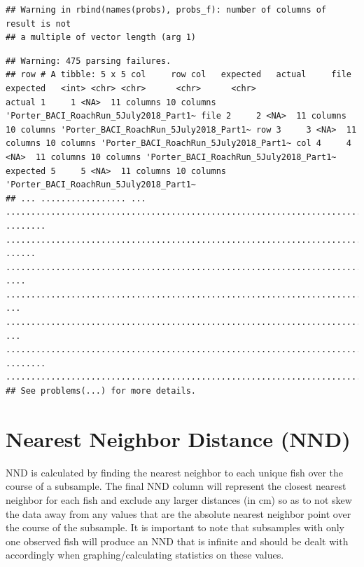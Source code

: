 \documentclass[]{article}
\begin{document}
\begin{verbatim}
## Warning in rbind(names(probs), probs_f): number of columns of result is not
## a multiple of vector length (arg 1)
\end{verbatim}

\begin{verbatim}
## Warning: 475 parsing failures.
## row # A tibble: 5 x 5 col     row col   expected   actual     file                                   expected   <int> <chr> <chr>      <chr>      <chr>                                  actual 1     1 <NA>  11 columns 10 columns 'Porter_BACI_RoachRun_5July2018_Part1~ file 2     2 <NA>  11 columns 10 columns 'Porter_BACI_RoachRun_5July2018_Part1~ row 3     3 <NA>  11 columns 10 columns 'Porter_BACI_RoachRun_5July2018_Part1~ col 4     4 <NA>  11 columns 10 columns 'Porter_BACI_RoachRun_5July2018_Part1~ expected 5     5 <NA>  11 columns 10 columns 'Porter_BACI_RoachRun_5July2018_Part1~
## ... ................. ... .......................................................................... ........ .......................................................................... ...... .......................................................................... .... .......................................................................... ... .......................................................................... ... .......................................................................... ........ ..........................................................................
## See problems(...) for more details.
\end{verbatim}

\section{Nearest Neighbor Distance
(NND)}\label{nearest-neighbor-distance-nnd}

NND is calculated by finding the nearest neighbor to each unique fish
over the course of a subsample. The final NND column will represent the
closest nearest neighbor for each fish and exclude any larger distances
(in cm) so as to not skew the data away from any values that are the
absolute nearest neighbor point over the course of the subsample. It is
important to note that subsamples with only one observed fish will
produce an NND that is infinite and should be dealt with accordingly
when graphing/calculating statistics on these values.
\end{document}
